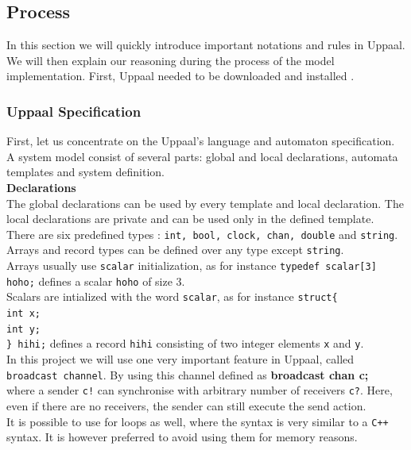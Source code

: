\documentclass[a4paper, twocolumn]{article}
\begin{document}
\subsection{Process}
In this section we will quickly introduce important notations and rules in Uppaal. We will then explain our reasoning during the process of the model implementation. 
First, Uppaal needed to be downloaded and installed \cite{install}.
\subsubsection{Uppaal Specification} %
First, let us concentrate on the Uppaal's language and automaton specification.\\
A system model consist of several parts: global and local declarations, automata templates and system definition.\\

\noindent\textbf{Declarations}\\
The global declarations can be used by every template and local declaration. The local declarations are private and can be used only in the defined template.\\
There are six predefined types : \texttt{int, bool, clock, chan, double} and \texttt{string}. Arrays and record types can be defined over any type except \texttt{string}. \\
Arrays usually use \texttt{scalar} initialization, as for instance \colorbox{backcolour}{\texttt{typedef scalar[3] hoho;}} defines a scalar \texttt{hoho} of size 3.\\
Scalars are intialized with the word \texttt{scalar}, as for instance \colorbox{backcolour}{\texttt{struct\{ \\int x;\\int y;\\ \} hihi;}} defines a record \texttt{hihi} consisting of two integer elements \texttt{x} and \texttt{y}.\\
In this project we will use one very important feature in Uppaal, called \texttt{broadcast channel}. By using this channel defined as \colorbox{backcolour}{\textbf{broadcast chan c;}}\\
where a sender \texttt{c!} can synchronise with arbitrary  number of receivers \texttt{c?}. Here, even if there are no receivers, the sender can still execute the send action.\\
It is possible to use for loops as well, where the syntax is very similar to a \texttt{C++} syntax. It is however preferred to avoid using them for memory reasons.\\
\end{document}
